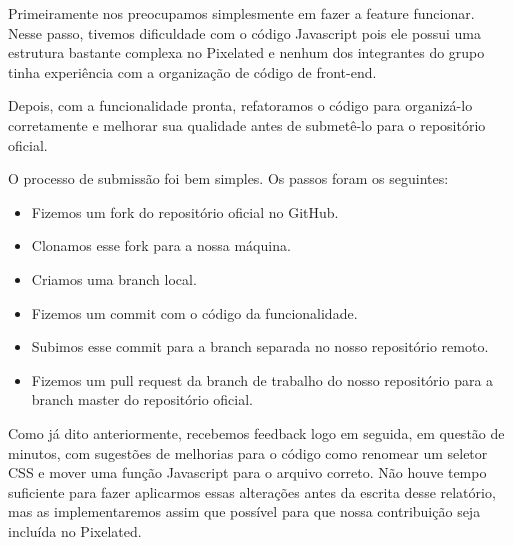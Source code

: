 Primeiramente nos preocupamos simplesmente em fazer a feature funcionar.
Nesse passo, tivemos dificuldade com o código Javascript pois ele
possui uma estrutura bastante complexa no Pixelated e nenhum dos integrantes do
grupo tinha experiência com a organização de código de front-end.

Depois, com a funcionalidade pronta, refatoramos o código para organizá-lo
corretamente e melhorar sua qualidade antes de submetê-lo para o repositório oficial.

O processo de submissão foi bem simples. Os passos foram os seguintes:
  \begin{itemize}
    \item Fizemos um fork do repositório oficial no GitHub.
    \item Clonamos esse fork para a nossa máquina.
    \item Criamos uma branch local.
    \item Fizemos um commit com o código da funcionalidade.
    \item Subimos esse commit para a branch separada no nosso repositório remoto.
    \item Fizemos um pull request da branch de trabalho do nosso repositório
    para a branch master do repositório oficial.
  \end{itemize}

Como já dito anteriormente, recebemos feedback logo em seguida, em questão de
minutos, com sugestões de melhorias para o código como renomear um seletor CSS
e mover uma função Javascript para o arquivo correto. Não houve tempo suficiente
para fazer aplicarmos essas alterações antes da escrita desse relatório, mas
as implementaremos assim que possível para que nossa contribuição seja incluída
no Pixelated.